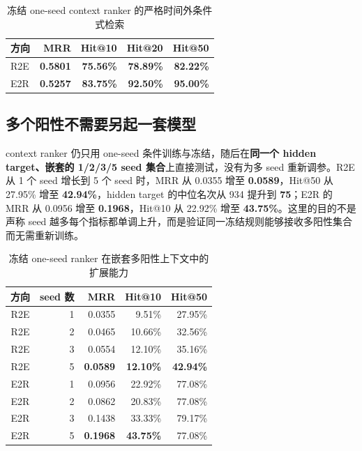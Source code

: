 \documentclass[11pt,a4paper]{ctexart}
\begin{document}
\begin{table}[htbp]
\centering
\small
\caption{冻结 one-seed context ranker 的严格时间外条件式检索}
\begin{tabular}{lrrrr}
\toprule
\textbf{方向} & \textbf{MRR} & \textbf{Hit@10} & \textbf{Hit@20} & \textbf{Hit@50}\\
\midrule
R2E & \textbf{0.5801} & \textbf{75.56\%} & \textbf{78.89\%} & \textbf{82.22\%}\\
E2R & \textbf{0.5257} & \textbf{83.75\%} & \textbf{92.50\%} & \textbf{95.00\%}\\
\bottomrule
\end{tabular}
\end{table}

\subsection{多个阳性不需要另起一套模型}

context ranker 仍只用 one-seed 条件训练与冻结，随后在\textbf{同一个 hidden target、嵌套的 1/2/3/5 seed 集合}上直接测试，没有为多 seed 重新调参。R2E 从 1 个 seed 增长到 5 个 seed 时，MRR 从 0.0355 增至 \textbf{0.0589}，Hit@50 从 27.95\% 增至 \textbf{42.94\%}，hidden target 的中位名次从 934 提升到 \textbf{75}；E2R 的 MRR 从 0.0956 增至 \textbf{0.1968}，Hit@10 从 22.92\% 增至 \textbf{43.75\%}。这里的目的不是声称 seed 越多每个指标都单调上升，而是验证同一冻结规则能够接收多阳性集合而无需重新训练。

\begin{table}[htbp]
\centering
\small
\caption{冻结 one-seed ranker 在嵌套多阳性上下文中的扩展能力}
\begin{tabular}{crrrr}
\toprule
\textbf{方向} & \textbf{seed 数} & \textbf{MRR} & \textbf{Hit@10} & \textbf{Hit@50}\\
\midrule
R2E & 1 & 0.0355 & 9.51\% & 27.95\%\\
R2E & 2 & 0.0465 & 10.66\% & 32.56\%\\
R2E & 3 & 0.0554 & 12.10\% & 35.16\%\\
R2E & 5 & \textbf{0.0589} & \textbf{12.10\%} & \textbf{42.94\%}\\
E2R & 1 & 0.0956 & 22.92\% & 77.08\%\\
E2R & 2 & 0.0862 & 20.83\% & 77.08\%\\
E2R & 3 & 0.1438 & 33.33\% & 79.17\%\\
E2R & 5 & \textbf{0.1968} & \textbf{43.75\%} & 77.08\%\\
\bottomrule
\end{tabular}
\end{table}
\end{document}
